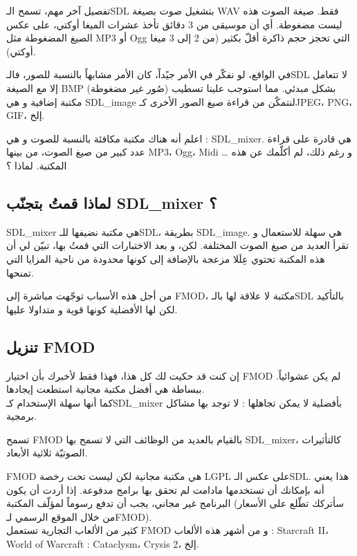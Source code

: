 تفصيل آخر مهم، تسمح الـ\textenglish{SDL}
بتشغيل صوت بصيغة
\textenglish{WAV}
فقط. صيغة الصوت هذه ليست مضغوطة. أي أن موسيقى من 3 دقائق تأخذ عشرات الميغا أوكتي،
على عكس الصيغ المضغوطة مثل
\textenglish{MP3}
أو
\textenglish{Ogg}
التي تحجز حجم ذاكرة أقلّ بكثير (من 2 إلى 3 ميغا أوكتي).

في الواقع، لو نفكّر في الأمر جيًداً، كان الأمر مشابهاً بالنسبة للصور، فالـ\textenglish{SDL}
لا تتعامل إلا مع الصيغة
\textenglish{BMP}
(صُور غير مضغوطة) بشكل مبدئي. مما استوجب علينا تسطيب مكتبة إضافية و هي
\textenglish{SDL\_image}
لنتمكّن من قراءة صيغ الصور الأخرى كـ\textenglish{JPEG}، \textenglish{PNG}، \textenglish{GIF}،
إلخ.

اعلم أنه هناك مكتبة مكافئة بالنسبة للصوت و هي :
\textenglish{SDL\_mixer}.
هي قادرة على قراءة عدد كبير من صيغ الصوت، من بينها
\textenglish{MP3}، \textenglish{Ogg}، \textenglish{Midi} \dots
و رغم ذلك، لم أكلّمك عن هذه المكتبة. لماذا ؟

\subsection{لماذا قمتُ بتجنّب \textenglish{SDL\_mixer} ؟}

\textenglish{SDL\_mixer}
هي مكتبة نضيفها للـ\textenglish{SDL}،
بطريقة 
\textenglish{SDL\_image}.
هي سهلة للاستعمال و تقرأ العديد من صيغ الصوت المختلفة. لكن، و بعد الاختبارات التي قمتُ بها، تبيّن لي أن هذه المكتبة تحتوي عِلَلا مزعجة بالإضافة إلى كونها محدودة من ناحية المزايا التي تمنحها.

من أجل هذه الأسباب توجّهت مباشرة إلى
\textenglish{FMOD}،
مكتبة لا علاقة لها بالـ\textenglish{SDL}
بالتأكيد لكن لها الأفضلية كونها قوية و متداولا عليها.

\subsection{تنزيل \textenglish{FMOD}}

إن كنت قد حكيت لك كل هذا، فهذا فقط لأخبرك بأن اختيار
\textenglish{FMOD}
لم يكن عشوائياً. ببساطة هي أفضل مكتبة مجانية استطعت إيجادها.\\
كما أنها سهلة الإستخدام كـ\textenglish{SDL\_mixer}
بأفضلية لا يمكن تجاهلها : لا توجد بها مشاكل برمجية.

تسمح
\textenglish{FMOD}
بالقيام بالعديد من الوظائف التي لا تسمح بها
\textenglish{SDL\_mixer}،
كالتأثيرات الصوتيّة ثلاثية الأبعاد.

\begin{warning}
\textenglish{FMOD}
هي مكتبة مجانية لكن ليست تحت رخصة
\textenglish{LGPL}
على عكس الـ\textenglish{SDL}.
هذا يعني أنه بإمكانك أن تستخدمها مادامت لم تحقق بها برامج مدفوعة. إذا أردت أن يكون البرنامج غير مجاني، يجب أن تدفع رسوماً لمؤلّف المكتبة (سأتركك تطّلع على الأسعار من خلال الموقع الرسمي لـ\textenglish{FMOD}).\\
كثير من الألعاب التجارية تستعمل
\textenglish{FMOD}
و من أشهر هذه الألعاب :
\textenglish{Starcraft II}، \textenglish{World of Warcraft : Cataclysm}، \textenglish{Crysis 2}،
إلخ.
\end{warning}

